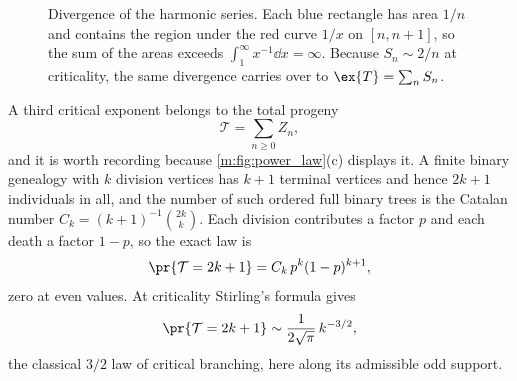 \begin{figure}[H]
    \centering
{}
\caption{Divergence of the harmonic series. Each blue rectangle has area $1/n$ and
contains the region under the red curve $1/x$ on $[n,n+1]$, so the sum of the areas
exceeds $\int_1^\infty x^{-1}\dd x=\infty$. Because $S_n\sim2/n$ at criticality,
the same divergence carries over to $\ex{T}=\sum_nS_n$.}
\label{m:fig:harmonic}
\end{figure}

A third critical exponent belongs to the total progeny
\begin{equation*}
\mathcal T = \sum_{n\ge0}Z_n ,
\end{equation*}
and it is worth recording because \cref{m:fig:power_law}(c) displays it. A finite
binary genealogy with $k$ division vertices has $k+1$ terminal vertices and hence
$2k+1$ individuals in all, and the number of such ordered full binary trees is the
Catalan number $C_k = (k+1)^{-1}\binom{2k}{k}$. Each division contributes a factor
$p$ and each death a factor $1-p$, so the exact law is
\begin{equation}
\label{m:eq:totalprogenyexact}
\pr{\mathcal T = 2k+1} = C_k\,p^k(1-p)^{k+1},
\end{equation}
zero at even values. At criticality Stirling's formula gives
\begin{equation}
\label{m:eq:totalprogenyasym}
\pr{\mathcal T = 2k+1} \sim \frac{1}{2\sqrt{\pi}}\,k^{-3/2},
\end{equation}
the classical $3/2$ law of critical branching, here along its admissible odd
support.

